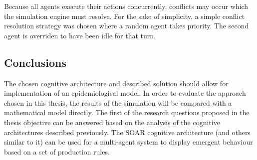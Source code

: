 Because all agents execute their actions concurrently, conflicts may occur which the simulation engine must resolve.
For the sake of simplicity, a simple conflict resolution strategy was chosen where a random agent takes priority.
The second agent is overriden to have been idle for that turn.

\subsection{Conclusions}

The chosen cognitive architecture and described solution should allow for implementation of an epidemiological model.
In order to evaluate the approach chosen in this thesis, the results of the simulation will be compared with a mathematical model directly.
The first of the research questions proposed in the thesis objective can be answered based on the analysis of the cognitive architectures described previously.
The SOAR cognitive architecture (and others similar to it) can be used for a multi-agent system to display emergent behaviour based on a set of production rules.

